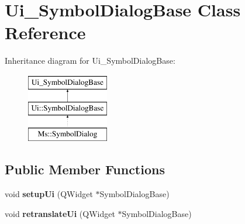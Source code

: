 \hypertarget{class_ui___symbol_dialog_base}{}\section{Ui\+\_\+\+Symbol\+Dialog\+Base Class Reference}
\label{class_ui___symbol_dialog_base}
Inheritance diagram for Ui\+\_\+\+Symbol\+Dialog\+Base\+:\begin{figure}[H]
\begin{center}
\leavevmode
\includegraphics[height=3.000000cm]{class_ui___symbol_dialog_base}
\end{center}
\end{figure}
\subsection*{Public Member Functions}
\begin{DoxyCompactItemize}
\item 
\mbox{\label{class_ui___symbol_dialog_base_a0b87ed3e984bfff5e2f595259ada0653}} 
void {\bfseries setup\+Ui} (Q\+Widget $\ast$Symbol\+Dialog\+Base)
\item 
\mbox{\label{class_ui___symbol_dialog_base_a40bced32960102c2649ddb25cacf2166}} 
void {\bfseries retranslate\+Ui} (Q\+Widget $\ast$Symbol\+Dialog\+Base)
\end{DoxyCompactItemize}
